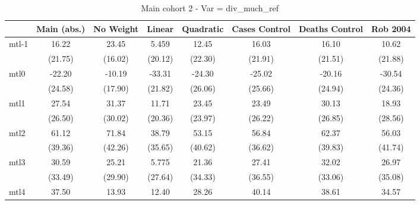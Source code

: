\documentclass{article}
\begin{document}
{
\def\sym#1{\ifmmode^{#1}\else\(^{#1}\)\fi}
\begin{longtable}{l*{7}{c}}
\caption{Main cohort 2 - Var = div\_much\_ref}\\
\hline\hline\endfirsthead\hline\endhead\hline\endfoot\endlastfoot
                &\multicolumn{1}{c}{Main (abs.)}&\multicolumn{1}{c}{No Weight}&\multicolumn{1}{c}{Linear}&\multicolumn{1}{c}{Quadratic}&\multicolumn{1}{c}{Cases Control}&\multicolumn{1}{c}{Deaths Control}&\multicolumn{1}{c}{Rob 2004}\\
\hline
mtl-1           &    16.22         &    23.45         &    5.459         &    12.45         &    16.03         &    16.10         &    10.62         \\
                &  (21.75)         &  (16.02)         &  (20.12)         &  (22.30)         &  (21.91)         &  (21.51)         &  (21.88)         \\
mtl0            &   -22.20         &   -10.19         &   -33.31         &   -24.30         &   -25.02         &   -20.16         &   -30.54         \\
                &  (24.58)         &  (17.90)         &  (21.82)         &  (26.06)         &  (25.66)         &  (24.94)         &  (24.36)         \\
mtl1            &    27.54         &    31.37         &    11.71         &    23.45         &    23.49         &    30.13         &    18.93         \\
                &  (26.50)         &  (30.02)         &  (20.36)         &  (23.97)         &  (26.22)         &  (26.85)         &  (28.56)         \\
mtl2            &    61.12         &    71.84         &    38.79         &    53.15         &    56.84         &    62.37         &    56.03         \\
                &  (39.36)         &  (42.26)         &  (35.65)         &  (40.62)         &  (36.62)         &  (39.83)         &  (41.74)         \\
mtl3            &    30.59         &    25.21         &    5.775         &    21.36         &    27.41         &    32.02         &    26.97         \\
                &  (33.49)         &  (29.90)         &  (27.64)         &  (34.33)         &  (36.55)         &  (33.06)         &  (35.08)         \\
mtl4            &    37.50         &    13.93         &    12.40         &    28.26         &    40.14         &    38.61         &    34.57         \\

\end{longtable}}
\end{document}

